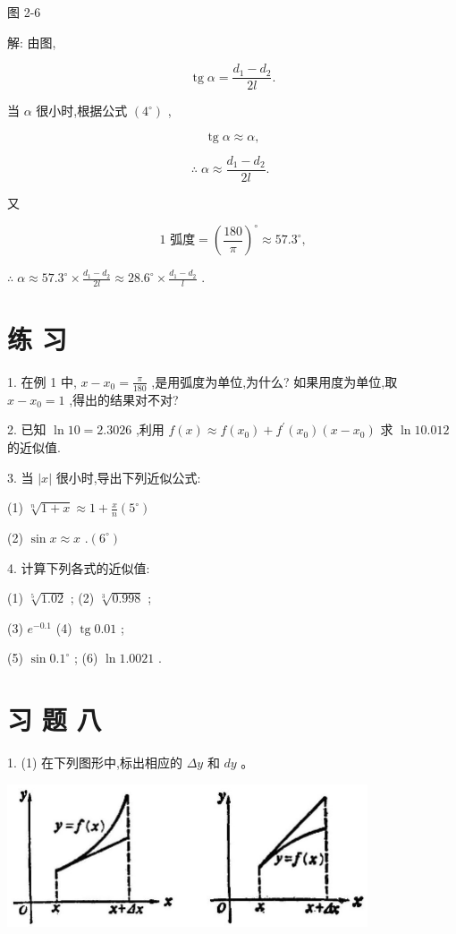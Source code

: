 \documentclass[10pt]{article}
\begin{document}
图 2-6

解: 由图,

\[
\operatorname{tg}\alpha = \frac{{d}_{1} - {d}_{2}}{2l}.
\]

当 \(\alpha\) 很小时,根据公式 \(\left( {4}^{ \circ }\right)\) ,

\[
\operatorname{tg}\alpha \approx \alpha ,
\]

\[
\therefore \;\alpha \approx \frac{{d}_{1} - {d}_{2}}{2l}\text{. }
\]

又

\[
\text{1 弧度} = {\left( \frac{180}{\pi }\right) }^{ \circ } \approx {57.3}^{ \circ }\text{,}
\]

\(\therefore \;\alpha \approx {57.3}^{ \circ } \times \frac{{d}_{1} - {d}_{2}}{2l} \approx {28.6}^{ \circ } \times \frac{{d}_{1} - {d}_{2}}{l}\) .

\section*{练 习}

1. 在例 1 中, \(x - {x}_{0} = \frac{\pi }{180}\) ,是用弧度为单位,为什么? 如果用度为单位,取 \(x - {x}_{0} = 1\) ,得出的结果对不对?

2. 已知 \(\ln {10} = {2.3026}\) ,利用 \(f\left( x\right) \approx f\left( {x}_{0}\right) + {f}^{\prime }\left( {x}_{0}\right) \left( {x - {x}_{0}}\right)\) 求 \(\ln {10.012}\) 的近似值.

3. 当 \(\left| x\right|\) 很小时,导出下列近似公式:

(1) \(\sqrt[n]{1 + x} \approx 1 + \frac{x}{n}\)\(\left( {5}^{ \circ }\right)\)

(2) \(\sin x \approx x\) .\(\left( {6}^{ \circ }\right)\)

4. 计算下列各式的近似值:

(1) \(\sqrt[5]{1.02}\) ; (2) \(\sqrt[3]{0.998}\) ;

(3) \({e}^{-{0.1}}\) (4) \(\operatorname{tg}{0.01}\) ;

(5) \(\sin {0.1}^{ \circ }\) ; (6) \(\ln {1.0021}\) .

\section*{习 题 八}

1. (1) 在下列图形中,标出相应的 \({\Delta y}\) 和 \({dy}\) 。

\begin{center}
\includegraphics[max width=0.8\textwidth]{images/01912c18-5c3f-733d-b775-749ba9897a9d_121_587843.jpg}
\end{center}
\end{document}
